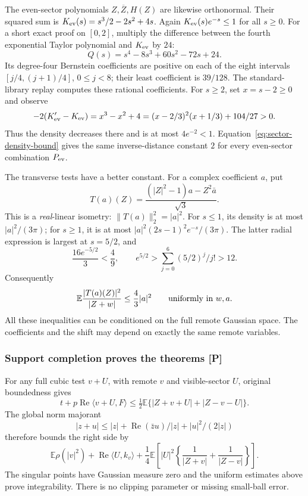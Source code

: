 The even-sector polynomials $Z,\overline Z,H(Z)$ are likewise
orthonormal. Their squared sum is
$K_{\rm ev}(s)=s^3/2-2s^2+4s$. Again
$K_{\rm ev}(s)e^{-s}\le1$ for all $s\ge0$.
For a short exact proof on $[0,2]$, multiply the difference between the
fourth exponential Taylor polynomial and $K_{\rm ev}$ by $24$:
\[
 Q(s)=s^4-8s^3+60s^2-72s+24.
\]
Its degree-four Bernstein coefficients are positive on each of the eight
intervals $[j/4,(j+1)/4]$, $0\le j<8$; their least coefficient is
$39/128$. The standard-library replay computes these rational
coefficients. For $s\ge2$, set $x=s-2\ge0$ and observe
\[
 -2(K_{\rm ev}'-K_{\rm ev})
 =x^3-x^2+4=(x-2/3)^2(x+1/3)+104/27>0.
\]
Thus the density decreases there and is at most $4e^{-2}<1$.
Equation~\eqref{eq:sector-density-bound} gives the same inverse-distance
constant $2$ for every even-sector combination $P_{\rm ev}$.

The transverse tests have a better constant. For a complex coefficient $a$,
put
\[
 T(a)(Z)=\frac{(|Z|^2-1)a-Z^2\bar a}{\sqrt3}.
\]
This is a \emph{real}-linear isometry: $\|T(a)\|_2^2=|a|^2$.
For $s\le1$, its density is at most $|a|^2/(3\pi)$; for $s\ge1$,
it is at most $|a|^2(2s-1)^2e^{-s}/(3\pi)$.
The latter radial expression is largest at $s=5/2$, and
\[
 \frac{16e^{-5/2}}3<\frac49,
 \qquad e^{5/2}>\sum_{j=0}^{6}(5/2)^j/j!>12.
\]
Consequently
\begin{equation}\label{eq:sector-transverse-cost}
 \mathbb E\frac{|T(a)(Z)|^2}{|Z+w|}\le\frac43|a|^2
 \qquad\hbox{uniformly in }w,a.
\end{equation}
All these inequalities can be conditioned on the full remote Gaussian
space. The coefficients and the shift may depend on exactly the same
remote variables.

\subsubsection{Support completion proves the theorems [P]}
For any full cubic test $v+U$, with remote $v$ and visible-sector $U$,
original boundedness gives
\[
 t+p\operatorname{Re}\langle v+U,F\rangle
 \le\tfrac12\mathbb E\{|Z+v+U|+|Z-v-U|\}.
\]
The global norm majorant
\[
 |z+u|\le|z|+\operatorname{Re}(\bar zu)/|z|+|u|^2/(2|z|)
\]
therefore bounds the right side by
\[
 \mathbb E\rho(|v|^2)+\operatorname{Re}\langle U,k_v\rangle
 +\frac14\mathbb E\left[|U|^2
       \left\{\frac1{|Z+v|}+\frac1{|Z-v|}\right\}\right].
\]
The singular points have Gaussian measure zero and the uniform estimates
above prove integrability. There is no clipping parameter or missing
small-ball error.

